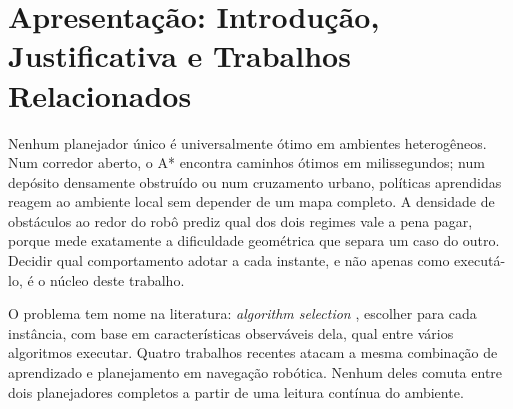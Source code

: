 \documentclass[12pt, a4paper]{article}
\begin{document}
\begin{abstract}
Revalidamos H1 com A* e BC reais no gêmeo 2D, o ambiente de simulação leve descrito na
Seção~\ref{sec:integracao}, sobre 1.500 \textit{trials} pareados. A motivação original não
sobreviveu: o A* real acertou 88,2\% contra 84,3\% do critério adaptivo, diferença significativa
pelo teste de McNemar, que compara dois métodos pareados sobre os mesmos casos
($p = 5{,}4 \times 10^{-5}$). Já a motivação por custo saiu reforçada, com razão de
$\sim$656$\times$ medida no mesmo ambiente contra $\sim$10$\times$ estimado antes. H1 passa
então a ser um argumento de custo computacional: o ganho do $\rho$-criterion está em sustentar
desempenho competitivo por uma fração do custo do melhor planejador fixo, sem necessariamente
superá-lo em sucesso bruto.

\vspace{4pt}
\noindent Palavras-chave: planejamento de trajetória; navegação autônoma; robótica
móvel; seleção de algoritmos (\textit{algorithm selection}); aprendizado por imitação
(\textit{behavior cloning}); aprendizado por reforço profundo; ROS2; Nav2; sistemas híbridos de
planejamento; densidade de obstáculos.
\end{abstract}


\section{Apresentação: Introdução, Justificativa e Trabalhos Relacionados}

Nenhum planejador único é universalmente ótimo em ambientes heterogêneos. Num corredor aberto, o
A* encontra caminhos ótimos em milissegundos; num depósito densamente obstruído ou num cruzamento
urbano, políticas aprendidas reagem ao ambiente local sem depender de um mapa completo. A
densidade de obstáculos ao redor do robô prediz qual dos dois regimes vale a pena pagar, porque
mede exatamente a dificuldade geométrica que separa um caso do outro. Decidir qual comportamento
adotar a cada instante, e não apenas como executá-lo, é o núcleo deste trabalho.

O problema tem nome na literatura: \textit{algorithm selection} \cite{Rice1976}, escolher para
cada instância, com base em características observáveis dela, qual entre vários algoritmos
executar. Quatro trabalhos recentes atacam a mesma combinação de aprendizado e planejamento em
navegação robótica. Nenhum deles comuta entre dois planejadores completos a partir de uma leitura
contínua do ambiente.
\end{document}
